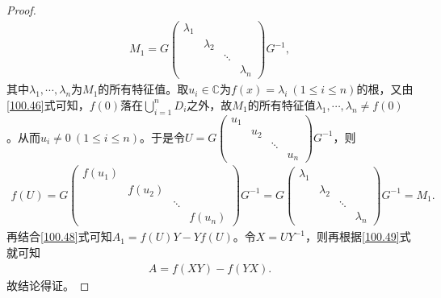 \documentclass[../../main.tex]{subfiles}
\begin{document}
\begin{proof}
\begin{align*}
M_1 = G\begin{pmatrix}
\lambda_1 & & & \\
& \lambda_2 & & \\
& & \ddots & \\
& & & \lambda_n
\end{pmatrix}G^{-1},
\end{align*}
其中$\lambda_1, \cdots, \lambda_n$为$M_1$的所有特征值。取$u_i \in \mathbb{C}$为$f(x) = \lambda_i\ (1 \leqslant i \leqslant n)$的根，又由\eqref{100.46}式可知，$f(0)$落在$\bigcup_{i=1}^n D_i$之外，故$M_1$的所有特征值$\lambda_1, \cdots, \lambda_n \ne f(0)$。从而$u_i \ne 0\ (1 \leqslant i \leqslant n)$。于是令$U = G\begin{pmatrix}
u_1 & & & \\
& u_2 & & \\
& & \ddots & \\
& & & u_n
\end{pmatrix}G^{-1}$，则
\begin{align*}
f(U) = G\begin{pmatrix}
f(u_1) & & & \\
& f(u_2) & & \\
& & \ddots & \\
& & & f(u_n)
\end{pmatrix}G^{-1} = G\begin{pmatrix}
\lambda_1 & & & \\
& \lambda_2 & & \\
& & \ddots & \\
& & & \lambda_n
\end{pmatrix}G^{-1} = M_1.
\end{align*}
再结合\eqref{100.48}式可知$A_1 = f(U)Y - Yf(U)$。令$X = UY^{-1}$，则再根据\eqref{100.49}式就可知
\begin{align*}
A = f(XY) - f(YX).
\end{align*}
故结论得证。
\end{proof}
\end{document}
